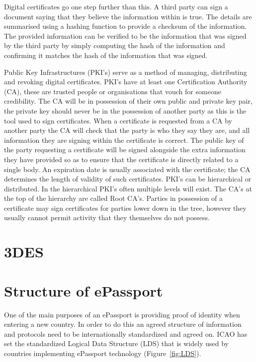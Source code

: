 \documentclass[12pt]{article}
\begin{document}
Digital certificates go one step further than this. A third party can sign a document saying that they believe the information within is true. The details are summarised using a hashing function to provide a checksum of the information. The provided information can be verified to be the information that was signed by the third party by simply computing the hash of the information and confirming it matches the hash of the information that was signed.

Public Key Infrastructures (PKI's) serve as a method of managing, distributing and revoking digital certificates. PKI's have at least one Certification Authority (CA), these are trusted people or organisations that vouch for someone credibility. The CA will be in possession of their own public and private key pair, the private key should never be in the possession of another party as this is the tool used to sign certificates. When a certificate is requested from a CA by another party the CA will check that the party is who they say they are, and all information they are signing within the certificate is correct. The public key of the party requesting a certificate will be signed alongside the extra information they have provided so as to ensure that the certificate is directly related to a single body. An expiration date is usually associated with the certificate; the CA determines the length of validity of such certificates. PKI's can be hierarchical or distributed. In the hierarchical PKI's often multiple levels will exist. The CA's at the top of the hierarchy are called Root CA's. Parties in possession of a certificate may sign certificates for parties lower down in the tree, however they usually cannot permit activity that they themselves do not possess.

\section{3DES}
\label{sec:3DES}
{\color{red}{How 3DES works and how is it so secure (not the main thing to worry about in the overall system)}}

\section{Structure of ePassport}
\label{sec:LDS}
One of the main purposes of an ePassport is providing proof of identity when entering a new country. In order to do this an agreed structure of information and protocols need to be internationally standardized and agreed on. ICAO has set the standardized Logical Data Structure (LDS) that is widely used by countries implementing ePassport technology (Figure~\ref{fig:LDS}).
\end{document}
